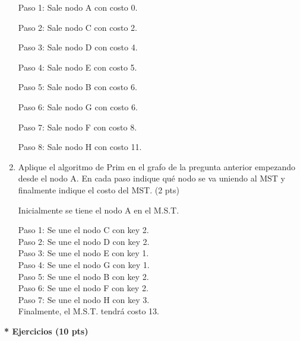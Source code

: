 \documentclass[a4paper,12pt]{article}
\begin{document}
\begin{enumerate}
Paso 1: Sale nodo A con costo 0.

Paso 2: Sale nodo C con costo 2.

Paso 3: Sale nodo D con costo 4.

Paso 4: Sale nodo E con costo 5.

Paso 5: Sale nodo B con costo 6.

Paso 6: Sale nodo G con costo 6.

Paso 7: Sale nodo F con costo 8.

Paso 8: Sale nodo H con costo 11.

\item Aplique el algoritmo de Prim en el grafo de la pregunta anterior empezando desde el nodo A. En cada paso indique qué nodo se va uniendo al MST  y finalmente indique el costo del MST. (2 pts)

Inicialmente se tiene el nodo A en el M.S.T.

Paso 1: Se une el nodo C con key 2. \\
Paso 2: Se une el nodo D con key 2. \\
Paso 3: Se une el nodo E con key 1. \\
Paso 4: Se une el nodo G con key 1. \\
Paso 5: Se une el nodo B con key 2. \\
Paso 6: Se une el nodo F con key 2. \\
Paso 7: Se une el nodo H con key 3. \\

Finalmente, el M.S.T. tendrá costo 13.

\end{enumerate}

\textbf{ * Ejercicios (10 pts)}
\end{document}
